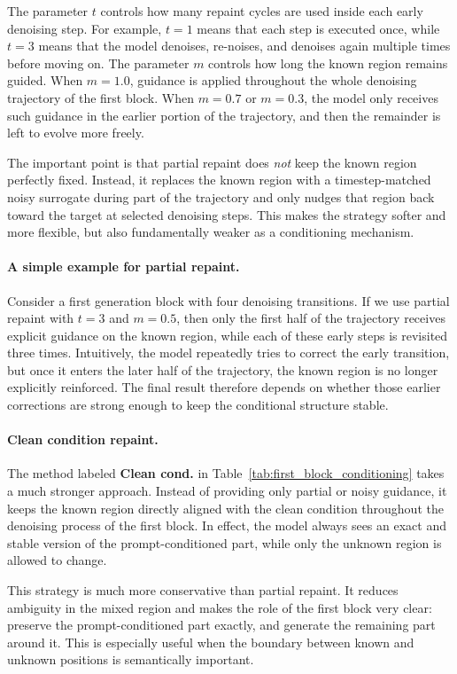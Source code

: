The parameter \(t\) controls how many repaint cycles are used inside each early denoising step. For example, \(t=1\) means that each step is executed once, while \(t=3\) means that the model denoises, re-noises, and denoises again multiple times before moving on. The parameter \(m\) controls how long the known region remains guided. When \(m=1.0\), guidance is applied throughout the whole denoising trajectory of the first block. When \(m=0.7\) or \(m=0.3\), the model only receives such guidance in the earlier portion of the trajectory, and then the remainder is left to evolve more freely.

The important point is that partial repaint does \emph{not} keep the known region perfectly fixed. Instead, it replaces the known region with a timestep-matched noisy surrogate during part of the trajectory and only nudges that region back toward the target at selected denoising steps. This makes the strategy softer and more flexible, but also fundamentally weaker as a conditioning mechanism.

\paragraph{A simple example for partial repaint.}
Consider a first generation block with four denoising transitions. If we use partial repaint with \(t=3\) and \(m=0.5\), then only the first half of the trajectory receives explicit guidance on the known region, while each of these early steps is revisited three times. Intuitively, the model repeatedly tries to correct the early transition, but once it enters the later half of the trajectory, the known region is no longer explicitly reinforced. The final result therefore depends on whether those earlier corrections are strong enough to keep the conditional structure stable.

\paragraph{Clean condition repaint.}
The method labeled \textbf{Clean cond.} in Table~\ref{tab:first_block_conditioning} takes a much stronger approach. Instead of providing only partial or noisy guidance, it keeps the known region directly aligned with the clean condition throughout the denoising process of the first block. In effect, the model always sees an exact and stable version of the prompt-conditioned part, while only the unknown region is allowed to change.

This strategy is much more conservative than partial repaint. It reduces ambiguity in the mixed region and makes the role of the first block very clear: preserve the prompt-conditioned part exactly, and generate the remaining part around it. This is especially useful when the boundary between known and unknown positions is semantically important.

